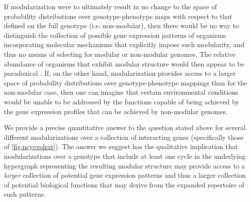 If modularization were to ultimately result in no change to the space of probability distributions over genotype-phenotype maps with respect to that defined on the full genotype (i.e. non-modular), then there would be no way to distinguish the collection of possible gene expression patterns of organisms incorporating molecular mechanisms that explicitly impose such modularity, and thus no means of selecting for modular or non-modular genomes. The relative abundance of organisms that exhibit modular structure would then appear to be paradoxical \cite{Jothi2009,Colm}. If, on the other hand, modularization provides access to a larger space of probability distributions over genotype-phenotype mappings than for the non-modular case, then one can imagine that certain environmental conditions would be unable to be addressed by the functions capable of being achieved by the gene expression profiles that can be achieved by non-modular genomes.

We provide a precise quantitative answer to the question stated above for several different modularizations over a collection of interacting genes (specifically those of \ref{fig:ncycvolrat}). The answer we suggest has the qualitative implication that modularizations over a genotype that include at least one cycle in the underlying hypergraph representing the resulting modular structure may provide access to a \emph{larger} collection of potential gene expression patterns and thus a larger collection of potential biological functions that may derive from the expanded repertoire of such patterns.
